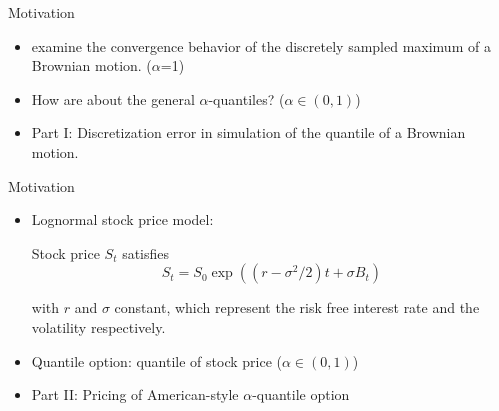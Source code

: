 \documentclass[cjk,10pt]{beamer}
\begin{document}
\begin{frame}{Motivation}
\begin{itemize}
\item
\cite{A-G-P-1995} examine the convergence behavior of the discretely sampled maximum of a Brownian motion. ($\alpha$=1)
\item
How are about the general $\alpha$-quantiles? ($\alpha \in (0,1)$)
\item
Part I: Discretization error in simulation of the quantile of a Brownian motion.
\end{itemize}
\end{frame}

\begin{frame}{Motivation}
\begin{itemize}
\item
Lognormal stock price model: 

Stock price $S_t$ satisfies 
\[
S_t=S_0\exp((r-\sigma^2 /2)t + \sigma B_t)
\]

with $r$ and $\sigma $ constant, which represent the risk free interest rate and the volatility respectively. 

\item
Quantile option: quantile of stock price ($\alpha \in (0,1)$)

\item
Part II: Pricing of American-style $\alpha$-quantile option
\end{itemize}
\end{frame}



%
%
%
%
\end{document}
